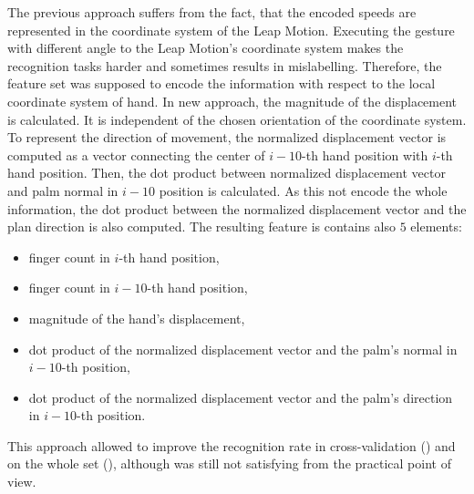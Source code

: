 The previous approach suffers from the fact, that the encoded speeds are represented in the coordinate system of the Leap Motion.
Executing the gesture with different angle to the Leap Motion's coordinate system makes the recognition tasks harder and sometimes results in mislabelling.
Therefore, the feature set was supposed to encode the information with respect to the local coordinate system of hand. 
In new approach, the magnitude of the displacement is calculated. 
It is independent of the chosen orientation of the coordinate system.
To represent the direction of movement, the normalized displacement vector is computed as a vector connecting the center of $i-10$-th hand position with $i$-th hand position.
Then, the dot product between normalized displacement vector and palm normal in $i-10$ position is calculated.
As this not encode the whole information, the dot product between the normalized displacement vector and the plan direction is also computed.
The resulting feature is contains also $5$ elements:
\begin{itemize}
\item finger count in $i$-th hand position,
\item finger count in $i-10$-th hand position,
\item magnitude of the hand's displacement,
\item dot product of the normalized displacement vector and the palm's normal in $i-10$-th position,
\item dot product of the normalized displacement vector and the palm's direction in $i-10$-th position.
\end{itemize}
This approach allowed to improve the recognition rate in cross-validation () and on the whole set (), although was still not satisfying from the practical point of view.


